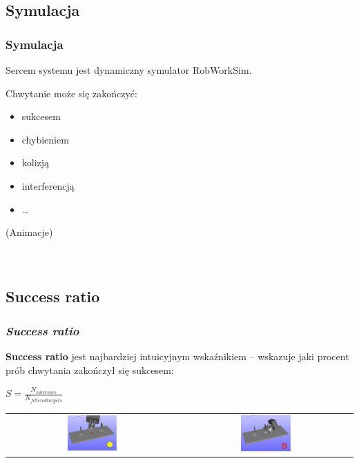 \documentclass[12pt,a4paper,portrait]{beamer}
\begin{document}
\subsection{Symulacja}
\begin{frame}
\frametitle{Symulacja}
Sercem systemu jest dynamiczny symulator RobWorkSim.


Chwytanie może się zakończyć:
\begin{itemize}
\item sukcesem
\item chybieniem
\item kolizją
\item interferencją
\item \dots
\end{itemize}
\begin{block}{(Animacje)}
 \\
 \\
 \\
\end{block}
\end{frame}

\subsection{Success ratio}
\begin{frame}
\frametitle{\textit{Success ratio}}
\textbf{Success ratio} jest najbardziej intuicyjnym wskaźnikiem -- wskazuje jaki procent prób chwytania zakończył się sukcesem:

\begin{center}
$S = \frac{N_{successes}}{N_{filtered targets}}$

\vspace*{1cm}

\begin{tabular}{cc}
\includegraphics[width=0.3\textwidth]{images/goodgrasp1} &
\includegraphics[width=0.3\textwidth]{images/badgrasp1}
\end{tabular}
\end{center}
\end{frame}
\end{document}
